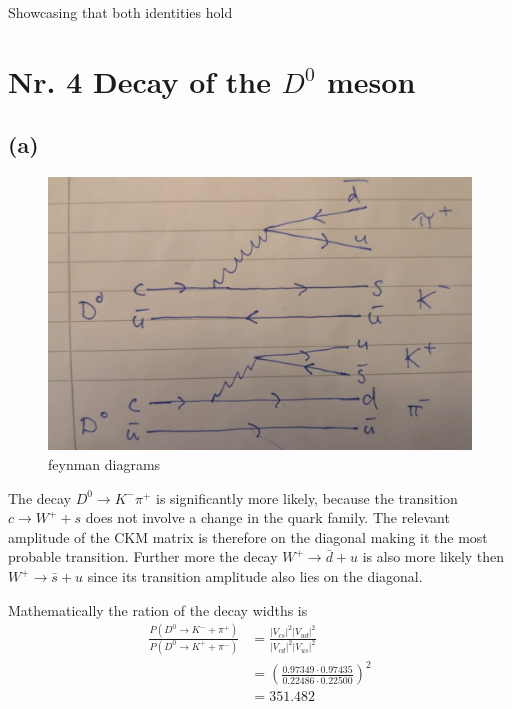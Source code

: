 \documentclass[11pt]{article}
\begin{document}
    

    Showcasing that both identities hold

    \hypertarget{nr.-4-decay-of-the-d0-meson}{%
\section{\texorpdfstring{Nr. 4 Decay of the \(D^0\)
meson}{Nr. 4 Decay of the D\^{}0 meson}}\label{nr.-4-decay-of-the-d0-meson}}

\hypertarget{a}{%
\subsection{(a)}\label{a}}

\begin{figure}
\centering
\includegraphics{feynman.jpg}
\caption{feynman diagrams}
\end{figure}

The decay \(D^0 \to K^-\pi^+\) is significantly more likely, because the
transition \(c\to W^+ + s\) does not involve a change in the quark
family. The relevant amplitude of the CKM matrix is therefore on the
diagonal making it the most probable transition. Further more the decay
\(W^+\to \bar d + u\) is also more likely then \(W^+\to \bar s+ u\)
since its transition amplitude also lies on the diagonal.

Mathematically the ration of the decay widths is 
\begin{align*}
    \frac{P(D^0\to K^- + \pi^+)}{P(D^0\to K^+ + \pi^-)}
    &= \frac{|V_{cs}|^2|V_{ud}|^2}{|V_{cd}|^2|V_{us}|^2}\\
    &= \left(\frac{0.97349\cdot 0.97435}{0.22486\cdot 0.22500}\right)^2\\
    &= 351.482
\end{align*}
\end{document}
